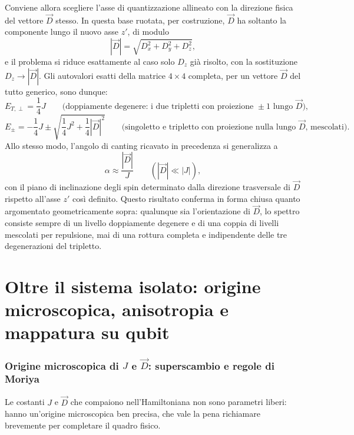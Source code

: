 \documentclass[11pt,a4paper]{article}
\begin{document}
Conviene allora scegliere l'asse di quantizzazione allineato con la direzione fisica
del vettore $\vec D$ stesso. In questa base ruotata, per costruzione, $\vec D$ ha
soltanto la componente lungo il nuovo asse $z'$, di modulo
$$|\vec D| = \sqrt{D_x^2+D_y^2+D_z^2},$$
e il problema si riduce esattamente al caso solo $D_z$ gi\`a risolto, con la
sostituzione $D_z\to|\vec D|$. Gli autovalori esatti della matrice $4\times4$
completa, per un vettore $\vec D$ del tutto generico, sono dunque:
$$E_{T,\perp} = \frac14 J \qquad \text{(doppiamente degenere: i due tripletti con proiezione } \pm1 \text{ lungo } \vec D\text{)},$$
$$E_\pm = -\frac14 J \pm \sqrt{\frac14 J^2 + \frac14|\vec D|^2} \qquad \text{(singoletto e tripletto con proiezione nulla lungo } \vec D\text{, mescolati)}.$$
Allo stesso modo, l'angolo di canting ricavato in precedenza si generalizza a
$$\alpha \approx \frac{|\vec D|}{J} \qquad (|\vec D|\ll|J|),$$
con il piano di inclinazione degli spin determinato dalla direzione trasversale di
$\vec D$ rispetto all'asse $z'$ cos\`i definito. Questo risultato conferma in forma
chiusa quanto argomentato geometricamente sopra: qualunque sia l'orientazione di
$\vec D$, lo spettro consiste sempre di un livello doppiamente degenere e di una
coppia di livelli mescolati per repulsione, mai di una rottura completa e indipendente
delle tre degenerazioni del tripletto.

\part{Oltre il sistema isolato: origine microscopica, anisotropia e mappatura su qubit}

\section{Origine microscopica di $J$ e $\vec D$: superscambio e regole di Moriya}

Le costanti $J$ e $\vec D$ che compaiono nell'Hamiltoniana non sono parametri liberi:
hanno un'origine microscopica ben precisa, che vale la pena richiamare brevemente per
completare il quadro fisico.
\end{document}
